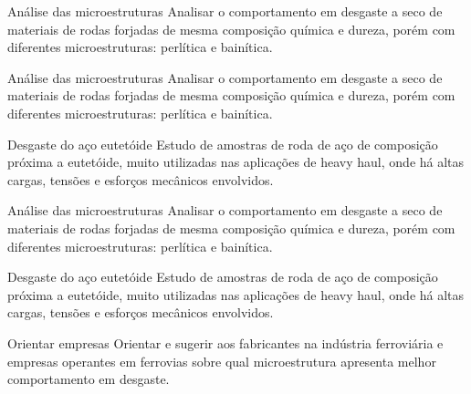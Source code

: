 \documentclass{beamer}
\begin{document}
\begin{frame}

\begin{block}{Análise das microestruturas}
	Analisar o comportamento em desgaste a seco de materiais de rodas forjadas de mesma composição química e dureza, porém com diferentes microestruturas: perlítica e bainítica.
\end{block}



\end{frame}
\begin{frame}

\begin{block}{Análise das microestruturas}
	Analisar o comportamento em desgaste a seco de materiais de rodas forjadas de mesma composição química e dureza, porém com diferentes microestruturas: perlítica e bainítica.
\end{block}

\begin{block}{Desgaste do aço eutetóide}
	Estudo de amostras de roda de aço de composição próxima a eutetóide, muito utilizadas nas aplicações de heavy haul, onde há altas cargas, tensões e esforços mecânicos envolvidos.
\end{block}

	

\end{frame}
\begin{frame}

\begin{block}{Análise das microestruturas}
	Analisar o comportamento em desgaste a seco de materiais de rodas forjadas de mesma composição química e dureza, porém com diferentes microestruturas: perlítica e bainítica.
\end{block}

\begin{block}{Desgaste do aço eutetóide}
	Estudo de amostras de roda de aço de composição próxima a eutetóide, muito utilizadas nas aplicações de heavy haul, onde há altas cargas, tensões e esforços mecânicos envolvidos.

\end{block}

\begin{block}{Orientar empresas}
	Orientar e sugerir aos fabricantes na indústria ferroviária e empresas operantes em ferrovias sobre qual microestrutura apresenta melhor comportamento em desgaste.
	
\end{block}
\end{frame}
\end{document}
